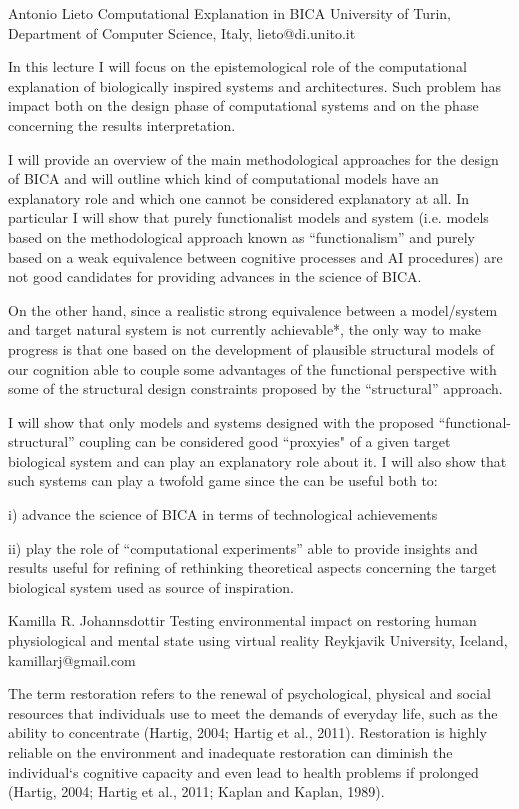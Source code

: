 \documentclass[10pt,fleqn,openany]{book} %
\begin{document}
\begin{enumerate}
	\paperabstract
		{Antonio Lieto}
		{Computational Explanation in BICA}
		{University of Turin, Department of Computer Science, Italy, lieto@di.unito.it}
		{
			In this lecture I will focus on the epistemological role of the computational explanation of biologically inspired systems and architectures. Such problem has impact both on the design phase of computational systems and on the phase concerning the results interpretation.
			
			I will provide an overview of the main methodological approaches for the design of BICA and will outline which kind of computational models have an explanatory role and which one cannot be considered explanatory at all. In particular I will show that purely functionalist models and system (i.e. models based on the methodological approach known as “functionalism” and purely based on a weak equivalence between cognitive processes and AI procedures) are not good candidates for providing advances in the science of BICA.
			
			On the other hand, since a realistic strong equivalence between a model/system and target natural system is not currently achievable*, the only way to make progress is that one based on the development of plausible structural models of our cognition able to couple some advantages of the functional perspective with some of the structural design constraints proposed by the “structural” approach.
			
			I will show that only models and systems designed with the proposed “functional- structural” coupling can be considered good “proxyies" of a given target biological system and can play an explanatory role about it. I will also show that such systems can play a twofold game since the can be useful both to:
			
			i) advance the science of BICA in terms of technological achievements
			
			ii) play the role of “computational experiments” able to provide insights and results useful for refining of rethinking theoretical aspects concerning the target biological system used as source of inspiration.}
		
	\paperabstract
		{Kamilla R. Johannsdottir}
		{Testing environmental impact on restoring human physiological and mental state using virtual reality}
		{Reykjavik University, Iceland, kamillarj@gmail.com}
		{
			The term restoration refers to the renewal of psychological, physical and social resources that individuals use to meet the demands of everyday life, such as the ability to concentrate (Hartig, 2004; Hartig et al., 2011). Restoration is highly reliable on the environment and inadequate restoration can diminish the individual‘s cognitive capacity and even lead to health problems if prolonged (Hartig, 2004; Hartig et al., 2011; Kaplan and Kaplan, 1989).
			
}
\end{enumerate}
\end{document}
